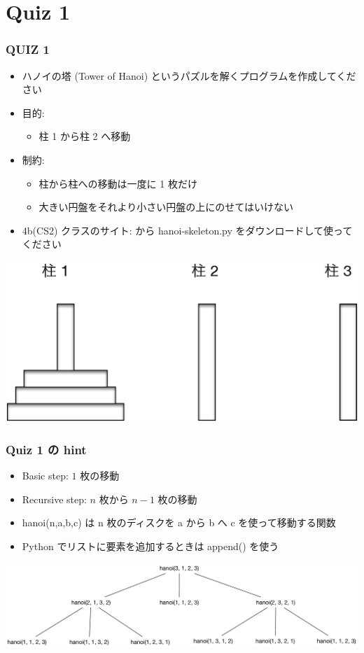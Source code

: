 \section{Quiz 1}
\begin{frame}
\frametitle{QUIZ 1}
  \begin{itemize}
\item ハノイの塔 (Tower of Hanoi) というパズルを解くプログラムを作成してください
\item 目的:
    \begin{itemize}
\item 柱 1 から柱 2 へ移動
    \end{itemize}
\item 制約:
    \begin{itemize}
\item 柱から柱への移動は一度に 1 枚だけ
\item 大きい円盤をそれより小さい円盤の上にのせてはいけない
    \end{itemize}
\item 4b(CS2) クラスのサイト: \href{https://sites.google.com/presystems.xyz/elementaryCS/}{} 
から hanoi-skeleton.py をダウンロードして使ってください
  \end{itemize}
  \begin{center}
\includegraphics[scale=0.4]{./Figure/elementaryCS-2nd-figHanoi.eps}
  \end{center}
\end{frame}
\begin{frame}
\frametitle{Quiz 1 の hint}
  \begin{itemize}
\item Basic step: $1$ 枚の移動
\item Recursive step: $n$ 枚から \(n-1\) 枚の移動
\item hanoi(n,a,b,c) は n 枚のディスクを a から b へ c を使って移動する関数
\item Python でリストに要素を追加するときは append() を使う
  \end{itemize}
  \begin{center}
\includegraphics[scale=0.28]{./Figure/elementaryCS-figHanoi-Hint.pdf}
  \end{center}
\end{frame}
